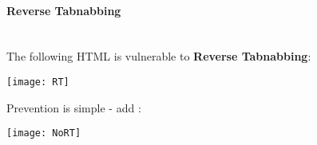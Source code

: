 \documentclass[../ESOF_notes.tex]{subfiles}
\begin{document}
\paragraph{Reverse Tabnabbing} \mbox{}\\

The following HTML is vulnerable to \textbf{Reverse Tabnabbing}:

\begin{center}
    \texttt{[image: RT]}
\end{center}

Prevention is simple - add :

\begin{center}
    \texttt{[image: NoRT]}
\end{center}
\end{document}
